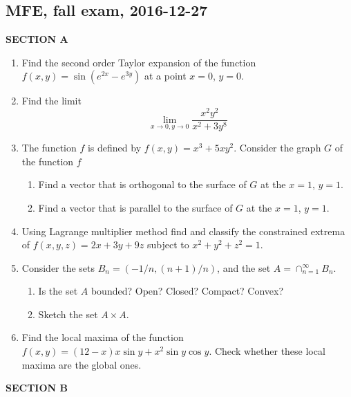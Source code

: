 \subsection{MFE, fall exam, 2016-12-27}


\textbf{SECTION A}

\begin{enumerate}


\item Find the second order Taylor expansion of the function $f(x, y) = \sin( e^{2x} - e^{3y})$ at a point $x = 0$, $y=0$.


\item Find the limit
\[
\lim_{x \to 0, y \to 0} \frac{x^2 y^2}{x^2 + 3y^8}
\]


\item The function $f$ is defined by $f(x, y) = x^3 + 5xy^2$. Consider the graph $G$ of the function $f$
\begin{enumerate}
  \item Find a vector that is orthogonal to the surface of $G$ at the $x=1$, $y=1$.
  \item Find a vector that is parallel to the surface of $G$ at the $x=1$, $y=1$.
\end{enumerate}

\item Using Lagrange multiplier method find and classify the constrained extrema of $f(x, y, z) =  2x +3y + 9z$ subject to $x^2 + y^2 + z^2 = 1$.


\item Consider the sets $B_n = \left(-1/n, (n+1)/n \right)$, and the set $A = \cap_{n=1}^{\infty} B_n$.
\begin{enumerate}
\item Is the set $A$ bounded? Open? Closed? Compact? Convex?
\item Sketch the set $A \times A$.
\end{enumerate}

\item Find the local maxima of the function $f(x, y) =  (12 - x) x \sin y + x^2 \sin y \cos y$. 
Check whether these local maxima are the global ones.


\end{enumerate}

\textbf{SECTION B}

